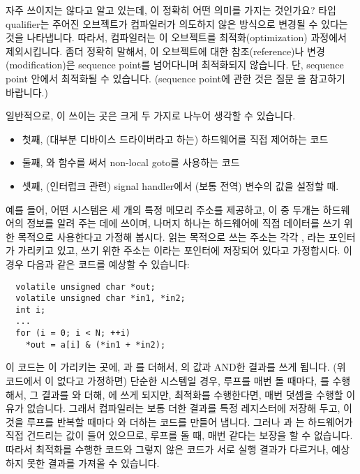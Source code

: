 \begin{faq}
	자주 쓰이지는 않다고 알고 있는데, 이 정확히 어떤
        의미를 가지는 것인가요?
\A
	 타입 qualifier는 주어진 오브젝트가 컴파일러가 의도하지
        않은 방식으로 변경될 수 있다는 것을 나타냅니다. 따라서, 컴파일러는
        이 오브젝트를 최적화(optimization) 과정에서 제외시킵니다. 좀더 정확히
        말해서, 이 오브젝트에 대한 참조(reference)나 변경(modification)은
        sequence point를 넘어다니며 최적화되지 않습니다. 단, sequence point
        안에서 최적화될 수 있습니다. (sequence point에 관한 것은 질문
        을 참고하기 바랍니다.)

        일반적으로, 이 쓰이는 곳은 크게 두 가지로 나누어 생각할
        수 있습니다.
        \begin{itemize}
          \item 첫째, (대부분 디바이스 드라이버라고 하는)
            하드웨어를 직접 제어하는 코드
          \item 둘째, 와  함수를 써서 non-local goto를
            사용하는 코드
          \item 셋째, (인터럽크 관련) signal handler에서
            (보통 전역) 변수의 값을 설정할 때.
        \end{itemize}
        
        예를 들어, 어떤 시스템은 세 개의 특정 메모리 주소를 제공하고,
        이 중 두개는 하드웨어의 정보를 알려 주는 데에 쓰이며, 나머지 하나는
        하드웨어에 직접 데이터를 쓰기 위한 목적으로 사용한다고 가정해 봅시다.
        읽는 목적으로 쓰는 주소는 각각 , 라는 포인터가 가리키고
        있고, 쓰기 위한 주소는 이라는 포인터에 저장되어 있다고
        가정합시다. 이 경우 다음과 같은 코드를 예상할 수 있습니다:
\begin{verbatim}
  volatile unsigned char *out;
  volatile unsigned char *in1, *in2;
  int i;
  ...
  for (i = 0; i < N; ++i)
    *out = a[i] & (*in1 + *in2);
\end{verbatim}
	이 코드는 이 가리키는 곳에, 과 를 더해서,
        의 값과 AND한 결과를 쓰게 됩니다. (위 코드에서 이
        없다고 가정하면) 단순한 시스템일 경우,
        루프를 매번 돌 때마다, 를 수행해서, 그 결과를 
        와 더해, 에 쓰게 되지만, 최적화를 수행한다면,
        매번  덧셈을 수행할 이유가 없습니다. 그래서 컴파일러는
        보통 더한 결과를 특정 레지스터에 저장해 두고, 이 것을 루프를 반복할
        때마다 와 더하는 코드를 만들어 냅니다. 그러나 과
        는 하드웨어가 직접 건드리는 값이 들어 있으므로, 루프를 돌 때,
        매번 같다는 보장을 할 수 없습니다. 따라서 최적화를 수행한 코드와
        그렇지 않은 코드가 서로 실행 결과가 다르거나, 예상하지 못한 결과를
        가져올 수 있습니다.


\end{faq}
